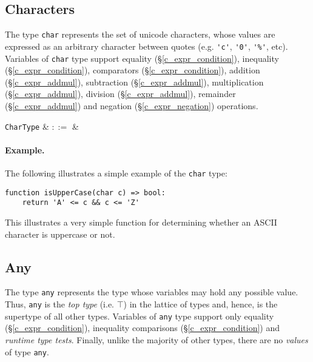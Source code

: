 \subsection{Characters}
\label{c_types_char}

The type \lstinline{char} represents the set of unicode characters, whose values are expressed as an arbitrary character between quotes (e.g. \lstinline{'c'}, \lstinline{'0'}, \lstinline{'%'}, etc).  Variables of \lstinline{char} type support equality (\S\ref{c_expr_condition}), inequality (\S\ref{c_expr_condition}), comparators (\S\ref{c_expr_condition}), addition (\S\ref{c_expr_addmul}), subtraction (\S\ref{c_expr_addmul}), multiplication (\S\ref{c_expr_addmul}), division (\S\ref{c_expr_addmul}), remainder (\S\ref{c_expr_addmul}) and negation (\S\ref{c_expr_negation}) operations. 

\begin{syntax}
  \verb+CharType+ & $::=$ &  \\
\end{syntax}

\paragraph{Example.} The following illustrates a simple example of the \lstinline{char} type:

\begin{lstlisting}
function isUpperCase(char c) => bool:
    return 'A' <= c && c <= 'Z'
\end{lstlisting}
This illustrates a very simple function for determining whether an ASCII character is uppercase or not.


\subsection{Any}
\label{c_types_any}

The type \lstinline{any} represents the type whose variables may hold any possible value.  Thus, \lstinline{any} is the {\em top type} (i.e. $\top$) in the lattice of types and, hence, is the supertype of all other types.  Variables of \lstinline{any} type support only equality (\S\ref{c_expr_condition}), inequality comparisons (\S\ref{c_expr_condition}) and {\em runtime type tests}.  Finally, unlike the majority of other types, there are no {\em values} of type \lstinline{any}.


